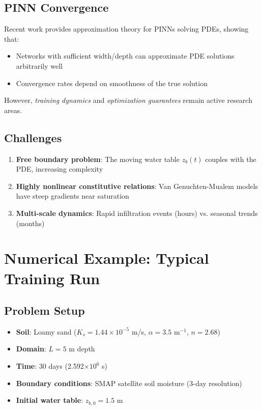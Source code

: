 \documentclass[11pt,a4paper]{article}
\begin{document}
\subsection{PINN Convergence}

Recent work \cite{Mishra2023} provides approximation theory for PINNs solving PDEs, showing that:
\begin{itemize}
    \item Networks with sufficient width/depth can approximate PDE solutions arbitrarily well
    \item Convergence rates depend on smoothness of the true solution
\end{itemize}

However, \textit{training dynamics} and \textit{optimization guarantees} remain active research areas.

\subsection{Challenges}

\begin{enumerate}
    \item \textbf{Free boundary problem}: The moving water table $z_b(t)$ couples with the PDE, increasing complexity
    \item \textbf{Highly nonlinear constitutive relations}: Van Genuchten-Mualem models have steep gradients near saturation
    \item \textbf{Multi-scale dynamics}: Rapid infiltration events (hours) vs. seasonal trends (months)
\end{enumerate}

\section{Numerical Example: Typical Training Run}

\subsection{Problem Setup}

\begin{itemize}
    \item \textbf{Soil}: Loamy sand ($K_s = 1.44 \times 10^{-5}$ m/s, $\alpha = 3.5$ m$^{-1}$, $n = 2.68$)
    \item \textbf{Domain}: $L = 5$ m depth
    \item \textbf{Time}: 30 days (2.592$\times 10^6$ s)
    \item \textbf{Boundary conditions}: SMAP satellite soil moisture (3-day resolution)
    \item \textbf{Initial water table}: $z_{b,0} = 1.5$ m
\end{itemize}
\end{document}

